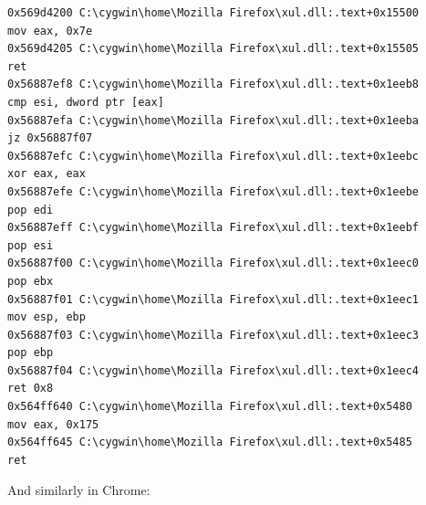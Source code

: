\documentclass[Lau,binding=0.6cm]{sapthesis}
\begin{document}
\begin{verbatim}
0x569d4200 C:\cygwin\home\Mozilla Firefox\xul.dll:.text+0x15500        mov eax, 0x7e
0x569d4205 C:\cygwin\home\Mozilla Firefox\xul.dll:.text+0x15505        ret 
0x56887ef8 C:\cygwin\home\Mozilla Firefox\xul.dll:.text+0x1eeb8        cmp esi, dword ptr [eax]
0x56887efa C:\cygwin\home\Mozilla Firefox\xul.dll:.text+0x1eeba        jz 0x56887f07
0x56887efc C:\cygwin\home\Mozilla Firefox\xul.dll:.text+0x1eebc        xor eax, eax
0x56887efe C:\cygwin\home\Mozilla Firefox\xul.dll:.text+0x1eebe        pop edi
0x56887eff C:\cygwin\home\Mozilla Firefox\xul.dll:.text+0x1eebf        pop esi
0x56887f00 C:\cygwin\home\Mozilla Firefox\xul.dll:.text+0x1eec0        pop ebx
0x56887f01 C:\cygwin\home\Mozilla Firefox\xul.dll:.text+0x1eec1        mov esp, ebp
0x56887f03 C:\cygwin\home\Mozilla Firefox\xul.dll:.text+0x1eec3        pop ebp
0x56887f04 C:\cygwin\home\Mozilla Firefox\xul.dll:.text+0x1eec4        ret 0x8
0x564ff640 C:\cygwin\home\Mozilla Firefox\xul.dll:.text+0x5480         mov eax, 0x175
0x564ff645 C:\cygwin\home\Mozilla Firefox\xul.dll:.text+0x5485         ret 

\end{verbatim}
\endgroup
And similarly in Chrome:
\end{document}

